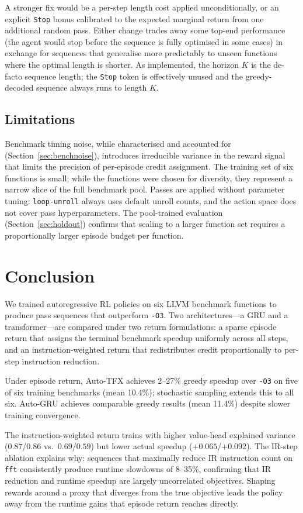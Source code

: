 \documentclass[conference]{IEEEtran}
\newcommand{\opt}[1]{\texttt{-O#1}}
\newcommand{\pass}[1]{\texttt{#1}}
\begin{document}
A stronger fix would be a per-step length cost applied unconditionally, or
an explicit \pass{Stop} bonus calibrated to the expected marginal return from
one additional random pass.
Either change trades away some top-end performance (the agent would stop before
the sequence is fully optimised in some cases) in exchange for sequences that
generalise more predictably to unseen functions where the optimal length is
shorter.
As implemented, the horizon $K$ is the de-facto sequence length; the
\pass{Stop} token is effectively unused and the greedy-decoded sequence always
runs to length $K$.

\subsection{Limitations}
Benchmark timing noise, while characterised and accounted for
(Section~\ref{sec:benchnoise}), introduces irreducible variance in the
reward signal that limits the precision of per-episode credit assignment.
The training set of six functions is small; while the functions were chosen
for diversity, they represent a narrow slice of the full benchmark pool.
Passes are applied without parameter tuning: \pass{loop-unroll} always
uses default unroll counts, and the action space does not cover pass
hyperparameters.
The pool-trained evaluation (Section~\ref{sec:holdout}) confirms that
scaling to a larger function set requires a proportionally larger episode
budget per function.

\section{Conclusion}
We trained autoregressive RL policies on six LLVM benchmark functions to
produce pass sequences that outperform \opt{3}.
Two architectures---a GRU and a transformer---are compared under two return
formulations: a sparse episode return that assigns the terminal benchmark
speedup uniformly across all steps, and an instruction-weighted return that
redistributes credit proportionally to per-step instruction reduction.

Under episode return, Auto-TFX achieves 2--27\% greedy speedup over \opt{3}
on five of six training benchmarks (mean 10.4\%); stochastic sampling extends
this to all six.
Auto-GRU achieves comparable greedy results (mean 11.4\%) despite slower
training convergence.

The instruction-weighted return trains with higher value-head explained
variance ($0.87$/$0.86$ vs.\ $0.69$/$0.59$) but lower actual speedup
($+0.065$/$+0.092$).
The IR-step ablation explains why: sequences that maximally reduce IR
instruction count on \texttt{fft} consistently produce runtime slowdowns of
8--35\%, confirming that IR reduction and runtime speedup are largely
uncorrelated objectives.
Shaping rewards around a proxy that diverges from the true objective leads the
policy away from the runtime gains that episode return reaches directly.
\end{document}
